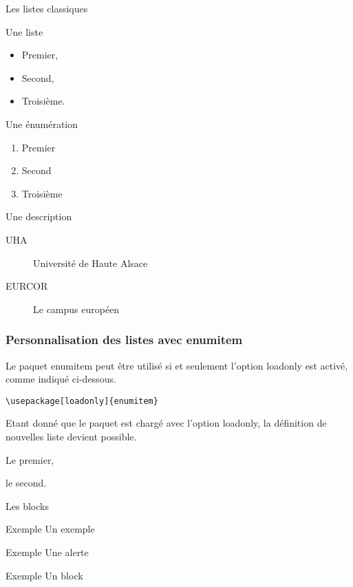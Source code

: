 \documentclass[9pt]{beamer}
\begin{document}
\begin{frame}{Les listes classiques}
	\begin{minipage}[t]{0.45\linewidth}
		\alert{Une liste}
		\begin{itemize}
				\item Premier,
				\item Second,
				\item Troisième.
		\end{itemize}
	\end{minipage}
	\hfill
	\begin{minipage}[t]{0.45\linewidth}
		\alert{Une énumération}
		\begin{enumerate}
				\item Premier
				\item Second
				\item Troisième
		\end{enumerate}
	\end{minipage}
	
	\vspace{2em}

	\alert{Une description}
	\begin{description}
			\item [UHA] Université de Haute Alsace
			\item [EURCOR] Le campus européen
	\end{description}
\end{frame}


\begin{frame}[fragile]
	\frametitle{Personnalisation des listes avec enumitem}
	Le paquet \alert{enumitem} peut être utilisé si et seulement l'option \alert{loadonly} est activé, comme indiqué ci-dessous.
\begin{verbatim}
\usepackage[loadonly]{enumitem}
\end{verbatim}
	Etant donné que le paquet est chargé avec l'option \alert{loadonly}, la définition de nouvelles liste devient possible.
	\begin{perso}
			\item Le premier,
			\item le second.
	\end{perso}
\end{frame}

\begin{frame}{Les blocks}
	\begin{exampleblock}{Exemple}
		Un exemple
	\end{exampleblock}
	\begin{alertblock}{Exemple}
		Une alerte
	\end{alertblock}
	\begin{block}{Exemple}
		Un block
	\end{block}
\end{frame}
\end{document}
